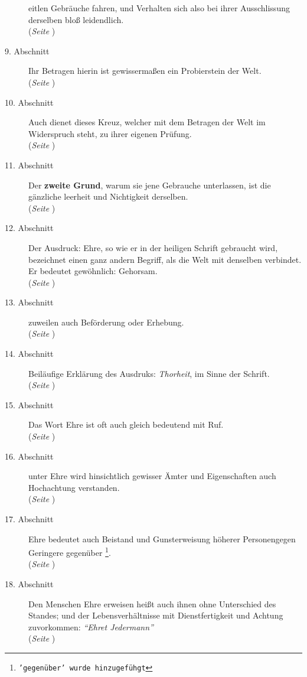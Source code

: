 \begin{description}
eitlen Gebräuche fahren, und Verhalten sich also bei ihrer Ausschlissung
derselben bloß leidendlich.
\\ (\textit{Seite \pageref{kap9_ab8}})
\item[9. Abschnitt] Ihr Betragen hierin ist gewissermaßen ein Probierstein der
Welt.
\\ (\textit{Seite \pageref{kap9_ab9}})
\item[10. Abschnitt] Auch dienet dieses Kreuz, welcher mit dem Betragen der Welt
im Widerspruch steht, zu ihrer eigenen Prüfung.
\\ (\textit{Seite \pageref{kap9_ab10}})
\item[11. Abschnitt] Der \textbf{zweite Grund}, warum sie jene Gebrauche
unterlassen, ist
die gänzliche leerheit und Nichtigkeit derselben.
\\ (\textit{Seite \pageref{kap9_ab11}})
\item[12. Abschnitt] Der Ausdruck: Ehre, so wie er in der heiligen Schrift
gebraucht wird, bezeichnet einen ganz andern Begriff, als die Welt mit denselben
verbindet. Er bedeutet gewöhnlich: Gehorsam.
\\ (\textit{Seite \pageref{kap9_ab12}})
\item[13. Abschnitt] zuweilen auch Beförderung oder Erhebung.
\\ (\textit{Seite \pageref{kap9_ab13}})
\item[14. Abschnitt] Beiläufige Erklärung des Ausdruks: \textit{Thorheit}, im
Sinne
der Schrift.
\\ (\textit{Seite \pageref{kap9_ab14}})
\item[15. Abschnitt] Das Wort Ehre ist oft auch gleich bedeutend mit Ruf.
\\ (\textit{Seite \pageref{kap9_ab15}})
\item[16. Abschnitt] unter Ehre wird hinsichtlich gewisser Ämter und
Eigenschaften auch Hochachtung verstanden.
\\ (\textit{Seite \pageref{kap9_ab16}})
\item[17. Abschnitt] Ehre bedeutet auch Beistand und Gunsterweisung höherer
Personengegen Geringere gegenüber
\footnote{\texttt{'gegenüber' wurde hinzugefühgt}}.
\\ (\textit{Seite \pageref{kap9_ab17}})
\item[18. Abschnitt]  Den Menschen Ehre erweisen heißt auch ihnen ohne
Unterschied des Standes; und der Lebensverhältnisse mit Dienstfertigkeit und
Achtung zuvorkommen: \textit{"`Ehret Jedermann"'}
\\ (\textit{Seite \pageref{kap9_ab18}})

\end{description}
